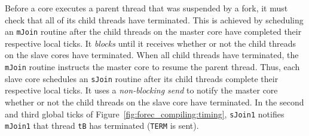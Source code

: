 Before a core executes a parent thread that was suspended by
a fork, it must check that all of its child threads have
terminated. This is achieved by scheduling an \verb$mJoin$
routine after the child threads on the master core have
completed their respective local ticks. It \emph{blocks}
until it receives whether or not the child threads on the
slave cores have terminated. When all child threads have
terminated, the \verb$mJoin$ routine instructs the master
core to resume the parent thread. Thus, each slave core
schedules an \verb$sJoin$ routine after its child threads
complete their respective local ticks. It uses a
\emph{non-blocking send} to notify the master core whether
or not the child threads on the slave core have terminated. 
In the second and third global ticks of 
Figure~\ref{fig:forec_compiling:timing}, \verb$sJoin1$
notifies \verb$mJoin1$ that thread \verb$tB$ has 
terminated (\verb$TERM$ is sent).

\begin{table}
	\centering
\end{table}

